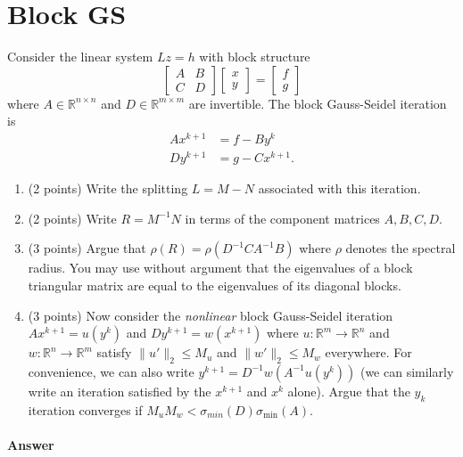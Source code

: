 \documentclass[12pt, leqno]{article} %
\providecommand{\tightlist}{%
  \setlength{\itemsep}{0pt}\setlength{\parskip}{0pt}}
\begin{document}
\section{Block GS}

Consider the linear system \(Lz = h\) with block structure
\[\begin{bmatrix} A & B \\ C & D \end{bmatrix}
  \begin{bmatrix} x \\ y \end{bmatrix} =
  \begin{bmatrix} f \\ g \end{bmatrix}\] where
\(A \in \mathbb{R}^{n \times n}\) and \(D \in \mathbb{R}^{m \times m}\)
are invertible. The block Gauss-Seidel iteration is \begin{align*}
  Ax^{k+1} &= f - B y^k \\
  Dy^{k+1} &= g - C x^{k+1}.
\end{align*}

\begin{enumerate}
\def\labelenumi{\arabic{enumi}.}
\tightlist
\item
  (2 points) Write the splitting \(L = M-N\) associated with this
  iteration.
\item
  (2 points) Write \(R = M^{-1} N\) in terms of the component matrices
  \(A, B, C, D\).
\item
  (3 points) Argue that \(\rho(R) = \rho(D^{-1} C A^{-1} B)\) where
  \(\rho\) denotes the spectral radius. You may use without argument
  that the eigenvalues of a block triangular matrix are equal to the
  eigenvalues of its diagonal blocks.
\item
  (3 points) Now consider the \emph{nonlinear} block Gauss-Seidel
  iteration \(Ax^{k+1} = u(y^k)\) and \(D y^{k+1} = w(x^{k+1})\) where
  \(u : \mathbb{R}^m \rightarrow \mathbb{R}^n\) and
  \(w : \mathbb{R}^n \rightarrow \mathbb{R}^m\) satisfy
  \(\|u'\|_2 \leq M_u\) and \(\|w'\|_2 \leq M_w\) everywhere. For
  convenience, we can also write \(y^{k+1} = D^{-1} w(A^{-1} u(y^k))\)
  (we can similarly write an iteration satisfied by the \(x^{k+1}\) and
  \(x^k\) alone). Argue that the \(y_{k}\) iteration converges if
  \(M_u M_w < \sigma_{min}(D) \sigma_{\min}(A)\).
\end{enumerate}

\paragraph{Answer}
\end{document}
